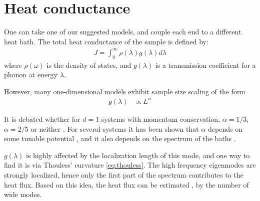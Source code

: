 \section{Heat conductance}

One can take one of our suggested models, and couple each end to a different heat bath.
The total heat conductance of the sample is defined by:
\begin{align}
J = \int_0^\infty \rho(\lambda) g(\lambda) d\lambda
\end{align}
where $\rho(\omega)$ is the density of states, and $g(\lambda)$ is 
a transmission coefficient for a phonon at energy $\lambda$.
 
However, many one-dimensional models 
\cite{narayan_anomalous_2002,dhar_heat_2001,lepri_anomalous_1998,savin_heat_2002} 
exhibit sample size scaling of the form
%
\begin{align}
g(\lambda)    &\propto L^\alpha
\end{align}

It is debated whether for $d=1$ systems
with momentum conservation,  $\alpha=1/3$,$\alpha=2/5$ or neither
\cite{narayan_anomalous_2002,delfini_comment_2008,dhar_dhar_2008,wang_power-law_2011}.
For several systems it has been shown that $\alpha$ depends on some tunable potential \cite{tong_wave_1999},
and it also depends on the spectrum of the baths \cite{dhar_heat_2001}.



$g(\lambda)$ is highly affected by the localization length of this mode, 
and one way to find it is via Thouless' curvature \autoref{eq:thouless}.
The high frequency eigenmodes are strongly localized, hence only the
first part of the spectrum contributes to the heat flux. Based on this idea,
the heat flux can be estimated \cite{lepri_thermal_2001,bodyfelt_unpub},
by the number of wide modes.



\begin{comment}
\section{Banded matrices spectrum}


For wide bandwidth and uncorrelated matrix elements, the high eigenvalues
should follow the Wigner semicircle law ($g(\lambda) = \frac{2}{\pi R^2}\sqrt{R^2-\lambda^2}$)
\cite{erdos_local_2012,fyodorov_scaling_1991,wigner_characteristic_1955}. However,
the low eigenvalues can still follow other rules, allowing for a transition
between diffusion and subdiffusion.
\end{comment}




